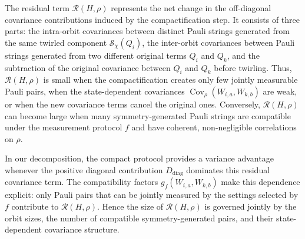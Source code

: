 \documentclass[prl,aps,notitlepage,superscriptaddress,showpacs,nofootinbib]{revtex4-2}
\begin{document}
{The residual term \(\mathcal R(H,\rho)\) represents the net change in the off-diagonal covariance contributions induced by the compactification step. It consists of three parts: the intra-orbit covariances between distinct Pauli strings generated from the same twirled component \(\mathcal S_{\chi}(Q_i)\), the inter-orbit covariances between Pauli strings generated from two different original terms \(Q_i\) and \(Q_k\), and the subtraction of the original covariance between \(Q_i\) and \(Q_k\) before twirling. Thus, \(\mathcal R(H,\rho)\) is small when the compactification creates only few jointly measurable Pauli pairs, when the state-dependent covariances \(\operatorname{Cov}_\rho(W_{i,a},W_{k,b})\) are weak, or when the new covariance terms cancel the original ones. 
Conversely, \(\mathcal R(H,\rho)\) can become large when many symmetry-generated Pauli strings are compatible under the measurement protocol \(f\) and have coherent, non-negligible correlations on \(\rho\). 

In our decomposition, the compact protocol provides a variance advantage whenever the positive diagonal contribution \(D_{\mathrm{diag}}\) dominates this residual covariance term. The compatibility factors \(g_f(W_{i,a},W_{k,b})\) make this dependence explicit: only Pauli pairs that can be jointly measured by the settings selected by \(f\) contribute to \(\mathcal R(H,\rho)\). Hence the size of \(\mathcal R(H,\rho)\) is governed jointly by the orbit sizes, the number of compatible symmetry-generated pairs, and their state-dependent covariance structure.
}
\end{document}
